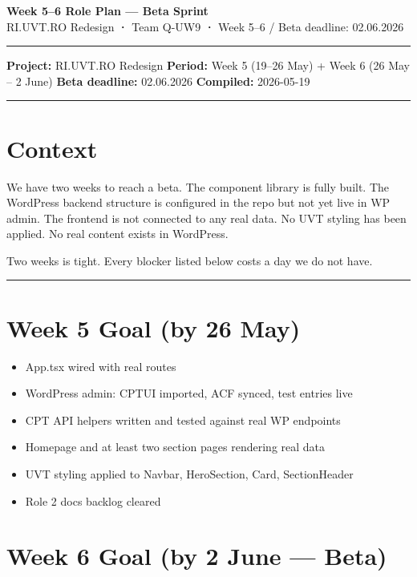 \documentclass[11pt,a4paper]{article}
\newcommand{\grouprule}{\vspace{0.3em}\textcolor{ruleLine}{\rule{\linewidth}{0.4pt}}\vspace{0.3em}}
\begin{document}
\begin{center}
    {\Large\bfseries\color{uvtBlue} Week 5--6 Role Plan --- Beta Sprint}\\[0.4em]
    {\small RI.UVT.RO Redesign \textbf{·} Team Q-UW9 \textbf{·} Week 5--6 / Beta deadline: 02.06.2026}
\end{center}

\vspace{0.3em}
\textcolor{uvtYellow}{\rule{\linewidth}{2pt}}
\vspace{0.8em}
\textbf{Project:} RI.UVT.RO Redesign
\textbf{Period:} Week 5 (19–26 May) + Week 6 (26 May – 2 June)
\textbf{Beta deadline:} 02.06.2026
\textbf{Compiled:} 2026-05-19

\grouprule

\section{Context}

We have two weeks to reach a beta. The component library is fully built. The WordPress backend structure is configured in the repo but not yet live in WP admin. The frontend is not connected to any real data. No UVT styling has been applied. No real content exists in WordPress.

Two weeks is tight. Every blocker listed below costs a day we do not have.

\grouprule

\section{Week 5 Goal (by 26 May)}

\begin{itemize}
\item App.tsx wired with real routes
\item WordPress admin: CPTUI imported, ACF synced, test entries live
\item CPT API helpers written and tested against real WP endpoints
\item Homepage and at least two section pages rendering real data
\item UVT styling applied to Navbar, HeroSection, Card, SectionHeader
\item Role 2 docs backlog cleared
\end{itemize}

\section{Week 6 Goal (by 2 June — Beta)}
\end{document}
